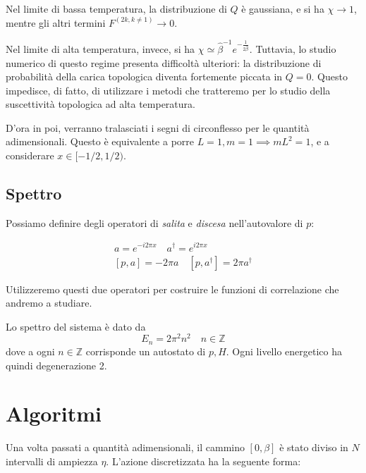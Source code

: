 \documentclass[a4paper,11pt]{article}
\begin{document}
    Nel limite di bassa temperatura, la distribuzione di $Q$ è gaussiana, e si ha $\chi \to 1$, mentre gli altri termini $F^{(2k, k \neq 1)} \to 0$.
    
    Nel limite di alta temperatura, invece, si ha $\chi \simeq \hat{\beta}^{-1} e^{-\frac{1}{2\hat{\beta}}}$. Tuttavia, lo studio numerico di questo regime presenta difficoltà ulteriori: la distribuzione di probabilità della carica topologica diventa fortemente piccata in $Q = 0$. Questo impedisce, di fatto, di utilizzare i metodi che tratteremo per lo studio della suscettività topologica ad alta temperatura.
    
    D'ora in poi, verranno tralasciati i segni di circonflesso per le quantità adimensionali. Questo è equivalente a porre $L=1, m = 1 \implies mL^2 = 1$, e a considerare $x \in [-1/2, 1/2)$.
    
    \subsection{Spettro}
    
    Possiamo definire degli operatori di \emph{salita} e \emph{discesa} nell'autovalore di $p$:
    
    \begin{eqnarray}
        a = e^{-i2\pi x} \quad a^\dagger = e^{i2\pi x} \\
        \left[p, a \right] = - 2\pi a \quad \left[p, a^\dagger \right] = 2 \pi a^\dagger
    \end{eqnarray}

    Utilizzeremo questi due operatori per costruire le funzioni di correlazione che andremo a studiare.
    
    Lo spettro del sistema è dato da
    \begin{equation}
        E_n = 2\pi^2 n^2 \quad n \in \mathbb{Z}
    \end{equation}
    dove a ogni $n \in \mathbb{Z}$ corrisponde un autostato di $p, H$. Ogni livello energetico ha quindi degenerazione 2.
    
    
    

    
\section{Algoritmi}

    Una volta passati a quantità adimensionali, il cammino $[0, \beta]$ è stato diviso in $N$ intervalli di ampiezza $\eta$. L'azione discretizzata ha la seguente forma:
    
\end{document}
